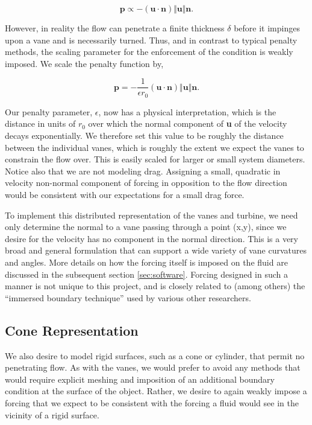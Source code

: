 \begin{equation}
 \textbf{p} \propto -\left(\textbf{u} \cdot \textbf{n}\right)
  \Vert \textbf{u} \Vert \textbf{n}.
\end{equation}

However, in reality the flow can penetrate a finite thickness $\delta$
before it impinges upon a vane and is necessarily turned. Thus, and in
contrast to typical penalty methods, the scaling parameter for the
enforcement of the condition is weakly imposed. We scale the penalty
function by, 

\begin{equation}
 \textbf{p} = - \frac{1}{\epsilon r_0} \left(\textbf{u} \cdot \textbf{n}\right)
  \Vert \textbf{u} \Vert \textbf{n}.
\end{equation}

Our penalty parameter, $\epsilon$, now has a physical interpretation,
which is the distance in units of $r_0$ over which the normal component
of \textbf{u} of the velocity decays exponentially. We therefore set
this value to be roughly the distance between the individual vanes,
which is roughly the extent we expect the vanes to constrain the flow
over. This is easily scaled for larger or small system diameters. 
Notice also that we are not modeling drag. Assigning a small, quadratic
in velocity non-normal component of forcing in opposition to the flow direction
would be consistent with our expectations for a small drag force. 

To implement this distributed representation of the vanes and turbine,
we need only determine the normal to a vane passing through a
point (x,y), since we desire for the velocity has no component in the
normal direction. This is a very broad and general formulation that can
support a wide variety of vane curvatures and angles. More details on
how the forcing itself is imposed on the fluid are discussed in the
subsequent section \ref{sec:software}. Forcing designed in such a manner
is not unique to this project, and is closely related to (among others)
the ``immersed boundary technique'' used by various other
researchers\cite{immersed}. 

\subsection{Cone Representation}

We also desire to model rigid surfaces, such as a cone or cylinder, that
permit no penetrating flow. As with the vanes, we would prefer to avoid
any methods that would require explicit meshing and imposition of an
additional boundary condition at the surface of the object. Rather, we
desire to again weakly impose a forcing that we expect to be consistent
with the forcing a fluid would see in the vicinity of a rigid surface. 

